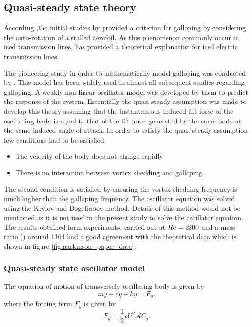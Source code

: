 \subsection{Quasi-steady state theory}
\label{QSS theory}


According \cite{Paidoussis2010},the initial studies by \cite{Glauert1919} provided a criterion for galloping by considering the auto-rotation of a stalled aerofoil. As this phenomenon commonly occur in iced transmission lines, \cite{DenHartog1956} has provided a theoretical explanation for iced electric transmission lines. 

The pioneering study in order to mathematically model galloping was conducted by \cite{Parkinson1964}. This model has been widely used in almost all subsequent studies regarding galloping. A weakly non-linear oscillator model was developed by them to predict the response of the system. Essentially the quasi-steady assumption was made to develop this theory assuming that the instantaneous induced lift force of the oscillating body is equal to that of the lift force generated by the same body at the same induced angle of attack. In order to satisfy the quasi-steady assumption few conditions had to be satisfied.

\begin{itemize}
 \item The velocity of the body does not change rapidly
 \item There is no interaction between vortex shedding and galloping
\end{itemize}

The second condition is satisfied by ensuring the vortex shedding frequency is much higher than the galloping frequency.
The oscillator equation was solved using the Krylov and Bogoliubov method. Details of this method would not be mentioned as it is not used in the present study to solve the oscillator equation. The results obtained form experiments, carried out at $Re=2200$ and a mass ratio (\mstar) around 1164 had a good agreement with the theoretical data which is shown in figure \ref{fig:parkinson_paper_data}.



\subsubsection*{Quasi-steady state oscillator model}

The equation of motion of transversely oscillating body is given by 
\begin{equation}
\label{equationofmotion}
m\ddot{y}+c\dot{y}+ky=F_y,
\end{equation}
where the forcing term $F_y$ is given by
\begin{equation}
\label{lift equation}
F_y=\frac{1}{2}\rho U^2\mathcal{A}C_y.
\end{equation}

